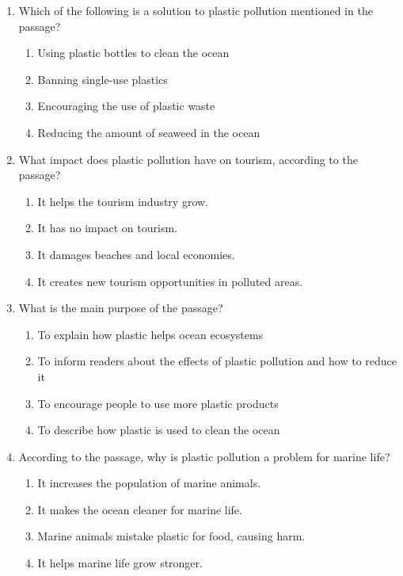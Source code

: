 \documentclass[12pt]{article}
\begin{document}
\begin{enumerate}
    \vspace{0.5cm}

    \item Which of the following is a solution to plastic pollution mentioned in the passage?
    \begin{enumerate}[label=\Alph*.]
        \item Using plastic bottles to clean the ocean
        \item Banning single-use plastics
        \item Encouraging the use of plastic waste
        \item Reducing the amount of seaweed in the ocean
    \end{enumerate}

    \vspace{0.5cm}

    \item What impact does plastic pollution have on tourism, according to the passage?
    \begin{enumerate}[label=\Alph*.]
        \item It helps the tourism industry grow.
        \item It has no impact on tourism.
        \item It damages beaches and local economies.
        \item It creates new tourism opportunities in polluted areas.
    \end{enumerate}

    \vspace{0.5cm}

    \item What is the main purpose of the passage?
    \begin{enumerate}[label=\Alph*.]
        \item To explain how plastic helps ocean ecosystems
        \item To inform readers about the effects of plastic pollution and how to reduce it
        \item To encourage people to use more plastic products
        \item To describe how plastic is used to clean the ocean
    \end{enumerate}

    \vspace{0.5cm}

    \item According to the passage, why is plastic pollution a problem for marine life?
    \begin{enumerate}[label=\Alph*.]
        \item It increases the population of marine animals.
        \item It makes the ocean cleaner for marine life.
        \item Marine animals mistake plastic for food, causing harm.
        \item It helps marine life grow stronger.
    \end{enumerate}


\end{enumerate}
\end{document}
